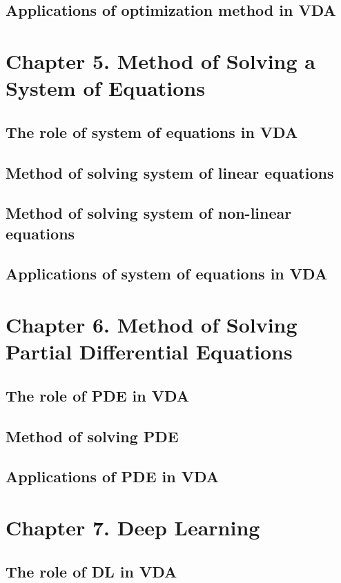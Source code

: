 \subsection{Applications of optimization method in VDA}

\newpage
\section{Chapter 5. Method of Solving a System of Equations}
\subsection{The role of system of equations in VDA}
\subsection{Method of solving system of linear equations}
\subsection{Method of solving system of non-linear equations}
\subsection{Applications of system of equations in VDA}

\section{Chapter 6. Method of Solving Partial Differential Equations}
\subsection{The role of PDE in VDA}
\subsection{Method of solving PDE}
\subsection{Applications of PDE in VDA}

\section{Chapter 7. Deep Learning}
\subsection{The role of DL in VDA}
